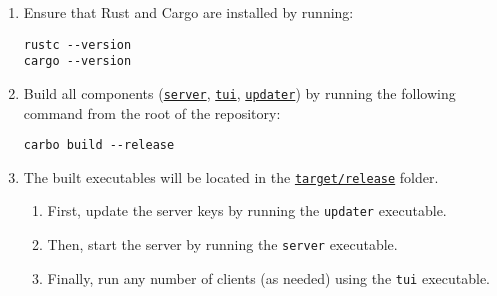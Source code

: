 \begin{enumerate}
    \item Ensure that Rust and Cargo are installed by running:
    
        \begin{lstlisting}
rustc --version
cargo --version
        \end{lstlisting}
    
    \item Build all components (\href{https://github.com/christiansassi/advanced-programming-of-cryptographic-methods-project/tree/main/server}{\texttt{server}}, \href{https://github.com/christiansassi/advanced-programming-of-cryptographic-methods-project/tree/main/tui}{\texttt{tui}}, \href{https://github.com/christiansassi/advanced-programming-of-cryptographic-methods-project/tree/main/config}{\texttt{updater}}) by running the following command from the root of the repository:

        \begin{lstlisting}
carbo build --release
        \end{lstlisting}

    \item The built executables will be located in the \href{https://github.com/christiansassi/advanced-programming-of-cryptographic-methods-project/tree/main/target/release}{\texttt{target/release}} folder.

        \begin{enumerate}
            \item First, update the server keys by running the \texttt{updater} executable.
            \item Then, start the server by running the \texttt{server} executable.
            \item Finally, run any number of clients (as needed) using the \texttt{tui} executable.
        \end{enumerate}

\end{enumerate}
